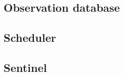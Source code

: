 \lipsum{}

\subsection{Observation database}
\label{sec:autonomous-obsdb}

\lipsum{}

\subsection{Scheduler}
\label{sec:autonomous-scheduler}

\lipsum{}

\subsection{Sentinel}
\label{sec:autonomous-sentinel}

\lipsum{}
